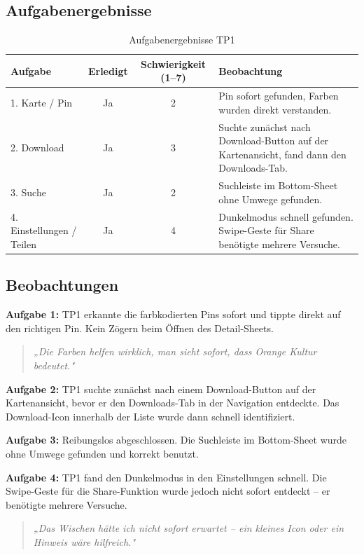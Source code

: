 \documentclass{article}
\begin{document}
\subsection*{Aufgabenergebnisse}

\begin{table}[H]
    \centering
    \begin{tabular}{|l|c|c|p{7cm}|}
        \hline
        \textbf{Aufgabe} & \textbf{Erledigt} & \textbf{Schwierigkeit (1–7)} & \textbf{Beobachtung} \\
        \hline
        1. Karte / Pin & Ja & 2 & Pin sofort gefunden, Farben wurden direkt verstanden. \\
        \hline
        2. Download & Ja & 3 & Suchte zunächst nach Download-Button auf der Kartenansicht, fand dann den Downloads-Tab. \\
        \hline
        3. Suche & Ja & 2 & Suchleiste im Bottom-Sheet ohne Umwege gefunden. \\
        \hline
        4. Einstellungen / Teilen & Ja & 4 & Dunkelmodus schnell gefunden. Swipe-Geste für Share benötigte mehrere Versuche. \\
        \hline
    \end{tabular}
    \caption{Aufgabenergebnisse TP1}
\end{table}

\subsection*{Beobachtungen}

\textbf{Aufgabe 1:} TP1 erkannte die farbkodierten Pins sofort und tippte direkt auf den
richtigen Pin. Kein Zögern beim Öffnen des Detail-Sheets.
\begin{quote}
    \textit{„Die Farben helfen wirklich, man sieht sofort, dass Orange Kultur bedeutet."}
\end{quote}

\textbf{Aufgabe 2:} TP1 suchte zunächst nach einem Download-Button auf der Kartenansicht,
bevor er den Downloads-Tab in der Navigation entdeckte.
Das Download-Icon innerhalb der Liste wurde dann schnell identifiziert.

\textbf{Aufgabe 3:} Reibungslos abgeschlossen.
Die Suchleiste im Bottom-Sheet wurde ohne Umwege gefunden und korrekt benutzt.

\textbf{Aufgabe 4:} TP1 fand den Dunkelmodus in den Einstellungen schnell.
Die Swipe-Geste für die Share-Funktion wurde jedoch nicht sofort entdeckt –
er benötigte mehrere Versuche.
\begin{quote}
    \textit{„Das Wischen hätte ich nicht sofort erwartet –
    ein kleines Icon oder ein Hinweis wäre hilfreich."}
\end{quote}
\end{document}
